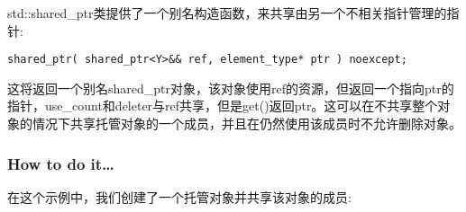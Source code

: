 
std::shared\_ptr类提供了一个别名构造函数，来共享由另一个不相关指针管理的指针:

\begin{lstlisting}[style=styleCXX]
shared_ptr( shared_ptr<Y>&& ref, element_type* ptr ) noexcept;
\end{lstlisting}

这将返回一个别名shared\_ptr对象，该对象使用ref的资源，但返回一个指向ptr的指针，use\_count和deleter与ref共享，但是get()返回ptr。这可以在不共享整个对象的情况下共享托管对象的一个成员，并且在仍然使用该成员时不允许删除对象。

\subsubsection{How to do it…}

在这个示例中，我们创建了一个托管对象并共享该对象的成员:

